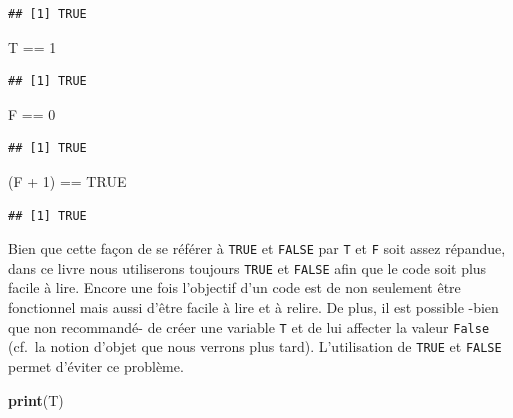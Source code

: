 \documentclass[twoside,symmetric]{book}
\newenvironment{Shaded}{}{}
\newcommand{\DecValTok}[1]{#1}
\newcommand{\KeywordTok}[1]{\textbf{#1}}
\newcommand{\NormalTok}[1]{#1}
\newcommand{\OperatorTok}[1]{#1}
\newcommand{\OtherTok}[1]{#1}
\newcommand{\StringTok}[1]{#1}
\begin{document}
\begin{verbatim}
## [1] TRUE
\end{verbatim}

\begin{Shaded}
\begin{Highlighting}[]
\NormalTok{T }\OperatorTok{==}\StringTok{ }\DecValTok{1}
\end{Highlighting}
\end{Shaded}

\begin{verbatim}
## [1] TRUE
\end{verbatim}

\begin{Shaded}
\begin{Highlighting}[]
\NormalTok{F }\OperatorTok{==}\StringTok{ }\DecValTok{0}
\end{Highlighting}
\end{Shaded}

\begin{verbatim}
## [1] TRUE
\end{verbatim}

\begin{Shaded}
\begin{Highlighting}[]
\NormalTok{(F }\OperatorTok{+}\StringTok{ }\DecValTok{1}\NormalTok{) }\OperatorTok{==}\StringTok{ }\OtherTok{TRUE}
\end{Highlighting}
\end{Shaded}

\begin{verbatim}
## [1] TRUE
\end{verbatim}

Bien que cette façon de se référer à \texttt{TRUE} et \texttt{FALSE} par \texttt{T} et \texttt{F} soit assez répandue, dans ce livre nous utiliserons toujours \texttt{TRUE} et \texttt{FALSE} afin que le code soit plus facile à lire. Encore une fois l'objectif d'un code est de non seulement être fonctionnel mais aussi d'être facile à lire et à relire. De plus, il est possible -bien que non recommandé- de créer une variable \texttt{T} et de lui affecter la valeur \texttt{False} (cf.~la notion d'objet que nous verrons plus tard). L'utilisation de \texttt{TRUE} et \texttt{FALSE} permet d'éviter ce problème.

\begin{Shaded}
\begin{Highlighting}[]
\KeywordTok{print}\NormalTok{(T)}
\end{Highlighting}
\end{Shaded}
\end{document}
